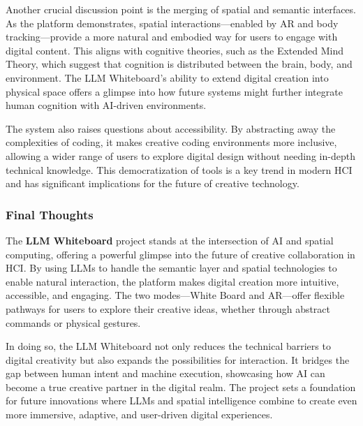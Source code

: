 Another crucial discussion point is the merging of spatial and semantic interfaces.
As the platform demonstrates, spatial interactions—enabled by AR and body tracking—provide a more natural and embodied way for users to engage with digital content.
This aligns with cognitive theories, such as the Extended Mind Theory, which suggest that cognition is distributed between the brain, body, and environment.
The LLM Whiteboard’s ability to extend digital creation into physical space offers a glimpse into how future systems might further integrate human cognition with AI-driven environments.

The system also raises questions about accessibility.
By abstracting away the complexities of coding, it makes creative coding environments more inclusive, allowing a wider range of users to explore digital design without needing in-depth technical knowledge.
This democratization of tools is a key trend in modern HCI and has significant implications for the future of creative technology.

\subsubsection{Final Thoughts}

The \textbf{LLM Whiteboard} project stands at the intersection of AI and spatial computing, offering a powerful glimpse into the future of creative collaboration in HCI.
By using LLMs to handle the semantic layer and spatial technologies to enable natural interaction, the platform makes digital creation more intuitive, accessible, and engaging.
The two modes—White Board and AR—offer flexible pathways for users to explore their creative ideas, whether through abstract commands or physical gestures.

In doing so, the LLM Whiteboard not only reduces the technical barriers to digital creativity but also expands the possibilities for interaction.
It bridges the gap between human intent and machine execution, showcasing how AI can become a true creative partner in the digital realm.
The project sets a foundation for future innovations where LLMs and spatial intelligence combine to create even more immersive, adaptive, and user-driven digital experiences.